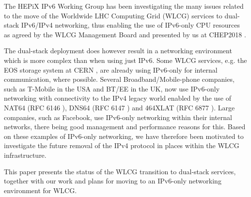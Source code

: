 

 


The HEPiX IPv6 Working Group \cite{ipv6wg} has been investigating the many issues related to the 
move of the Worldwide LHC Computing Grid (WLCG) services to dual-stack IPv6/IPv4 networking, thus enabling the use of
IPv6-only CPU resources as agreed by the WLCG Management Board and presented by us at 
CHEP2018 \cite{ipv6chep2018}. 

The dual-stack deployment does however result in a networking environment
which is more complex than when using just IPv6. Some WLCG services, e.g.
the EOS storage system at CERN \cite{eos}, are already using IPv6-only for internal communication,
where possible. Several Broadband/Mobile-phone companies, such as T-Mobile in the USA and
BT/EE in the UK, now use IPv6-only networking with connectivity to the IPv4
legacy world enabled by the use of NAT64 (RFC 6146 \cite{rfc}), DNS64 (RFC 6147 \cite{rfc}) and 464XLAT (RFC 6877 \cite{rfc}). Large companies, such
as Facebook, use IPv6-only networking within their internal networks, there
being good management and performance reasons for this. Based on these examples
of IPv6-only networking, we have therefore been motivated to investigate the future removal of the IPv4 protocol in
places within the WLCG infrastructure.

This paper presents the status of the WLCG transition to dual-stack services, together with 
our work and plans for moving to an IPv6-only networking environment for WLCG.

